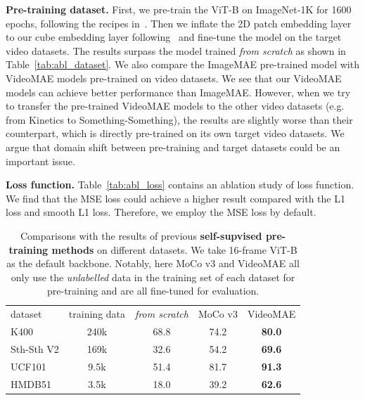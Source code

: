 \documentclass{article}
\newcommand{\tablestyle}[2]{\setlength{\tabcolsep}{#1}\renewcommand{\arraystretch}{#2}\centering\footnotesize}
\begin{document}
\par{\noindent \textbf{Pre-training dataset.}} 
First, we pre-train the ViT-B on ImageNet-1K for 1600 epochs, following the recipes in~\cite{he2021masked}. Then we inflate the 2D patch embedding layer to our cube embedding layer following~\cite{I3D} and fine-tune the model on the target video datasets. The results surpass the model trained \emph{from scratch} as shown in Table~\ref{tab:abl_dataset}. We also compare the ImageMAE pre-trained model with VideoMAE models pre-trained on video datasets. We see that our VideoMAE models can achieve better performance than ImageMAE. However, when we try to transfer the pre-trained VideoMAE models to the other video datasets (e.g. from Kinetics to Something-Something), the results are slightly worse than their counterpart, which is directly pre-trained on its own target video datasets. 
We argue that domain shift between pre-training and target datasets could be an important issue.


\par{\noindent \textbf{Loss function.}} Table~\ref{tab:abl_loss} contains an ablation
study of loss function. We find that the MSE loss could achieve a higher result compared with the L1 loss and smooth L1 loss. Therefore, we employ the MSE loss by default.

\begin{table}[t!]
\vspace{-.2em}
\tablestyle{3pt}{1.05}
\begin{tabular}{lcccc}
dataset   &   training data   & \emph{from scratch} &  MoCo v3  & VideoMAE \\
\shline 
K400    & 240k &   68.8   & 74.2  &  \textbf{80.0} \\
Sth-Sth V2   &  169k &  32.6 & 54.2  &  \textbf{69.6}   \\ 
UCF101   &  9.5k  & 51.4  &  81.7   &  \textbf{91.3} \\ 
HMDB51   &  3.5k   &   18.0  &  39.2  &  \textbf{62.6} \\ 
\end{tabular}
\caption{Comparisons with the results of previous \textbf{self-supvised pre-training methods} on different datasets. We take 16-frame ViT-B as the default backbone. Notably, here MoCo v3 and VideoMAE all only use the \textit{unlabelled} data in the training set of each dataset for pre-training and are all fine-tuned for evaluation.}
\label{tab:comparison_acc}
\vspace{-1.5em}
\end{table}
\end{document}
